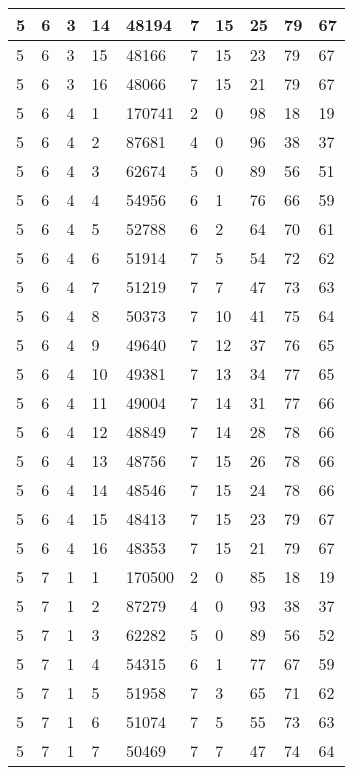 \begin{table}[!ht]
\begin{tabular}{|l|l|l|l|l|l|l|l|l|l|}
        5 & 6 & 3 & 14 & 48194 & 7 & 15 & 25 & 79 & 67 \\ \hline
        5 & 6 & 3 & 15 & 48166 & 7 & 15 & 23 & 79 & 67 \\ \hline
        5 & 6 & 3 & 16 & 48066 & 7 & 15 & 21 & 79 & 67 \\ \hline
        5 & 6 & 4 & 1 & 170741 & 2 & 0 & 98 & 18 & 19 \\ \hline
        5 & 6 & 4 & 2 & 87681 & 4 & 0 & 96 & 38 & 37 \\ \hline
        5 & 6 & 4 & 3 & 62674 & 5 & 0 & 89 & 56 & 51 \\ \hline
        5 & 6 & 4 & 4 & 54956 & 6 & 1 & 76 & 66 & 59 \\ \hline
        5 & 6 & 4 & 5 & 52788 & 6 & 2 & 64 & 70 & 61 \\ \hline
        5 & 6 & 4 & 6 & 51914 & 7 & 5 & 54 & 72 & 62 \\ \hline
        5 & 6 & 4 & 7 & 51219 & 7 & 7 & 47 & 73 & 63 \\ \hline
        5 & 6 & 4 & 8 & 50373 & 7 & 10 & 41 & 75 & 64 \\ \hline
        5 & 6 & 4 & 9 & 49640 & 7 & 12 & 37 & 76 & 65 \\ \hline
        5 & 6 & 4 & 10 & 49381 & 7 & 13 & 34 & 77 & 65 \\ \hline
        5 & 6 & 4 & 11 & 49004 & 7 & 14 & 31 & 77 & 66 \\ \hline
        5 & 6 & 4 & 12 & 48849 & 7 & 14 & 28 & 78 & 66 \\ \hline
        5 & 6 & 4 & 13 & 48756 & 7 & 15 & 26 & 78 & 66 \\ \hline
        5 & 6 & 4 & 14 & 48546 & 7 & 15 & 24 & 78 & 66 \\ \hline
        5 & 6 & 4 & 15 & 48413 & 7 & 15 & 23 & 79 & 67 \\ \hline
        5 & 6 & 4 & 16 & 48353 & 7 & 15 & 21 & 79 & 67 \\ \hline
        5 & 7 & 1 & 1 & 170500 & 2 & 0 & 85 & 18 & 19 \\ \hline
        5 & 7 & 1 & 2 & 87279 & 4 & 0 & 93 & 38 & 37 \\ \hline
        5 & 7 & 1 & 3 & 62282 & 5 & 0 & 89 & 56 & 52 \\ \hline
        5 & 7 & 1 & 4 & 54315 & 6 & 1 & 77 & 67 & 59 \\ \hline
        5 & 7 & 1 & 5 & 51958 & 7 & 3 & 65 & 71 & 62 \\ \hline
        5 & 7 & 1 & 6 & 51074 & 7 & 5 & 55 & 73 & 63 \\ \hline
        5 & 7 & 1 & 7 & 50469 & 7 & 7 & 47 & 74 & 64 \\ \hline

\end{tabular}
\end{table}
